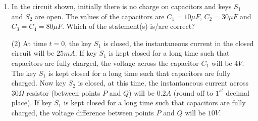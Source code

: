 
\begin{enumerate}
    \item In the circuit shown, initially there is no charge on capacitors and keys \( S_1 \) and \( S_2 \) are open. The values of the capacitors are \( C_1 = 10 \mu F \), \( C_2 = 30 \mu F \) and \( C_3 = C_4 = 80 \mu F \). Which of the statement(s) is/are correct?
        \begin{tasks}(2)
        	\task At time \( t = 0 \), the key \( S_1 \) is closed, the instantaneous current in the closed circuit will be \( 25 mA \).
        	\task If key \( S_1 \) is kept closed for a long time such that capacitors are fully charged, the voltage across the capacitor \( C_1 \) will be \( 4 V \).
        	\task The key \( S_1 \) is kept closed for a long time such that capacitors are fully charged. Now key \( S_2 \) is closed, at this time, the instantaneous current across \( 30 \Omega \) resistor (between points \( P \) and \( Q \)) will be \( 0.2 A \) (round off to \( 1^{st} \) decimal place).
        	\task If key \( S_1 \) is kept closed for a long time such that capacitors are fully charged, the voltage difference between points \( P \) and \( Q \) will be \( 10 V \).
        \end{tasks}
\end{enumerate}
\begin{center}
\end{center}
